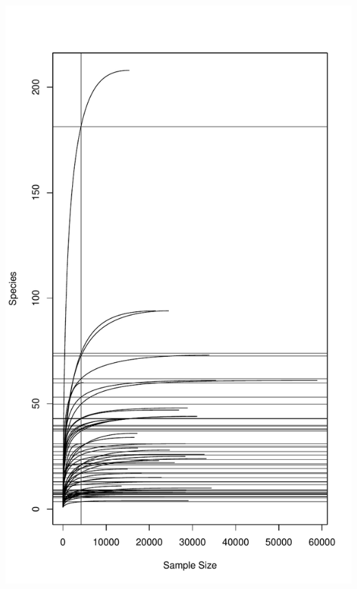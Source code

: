 \documentclass[
]{article}
\begin{document}
\includegraphics[width=1\linewidth]{manuscript_template_files/figure-latex/unnamed-chunk-24-4}
\end{document}
